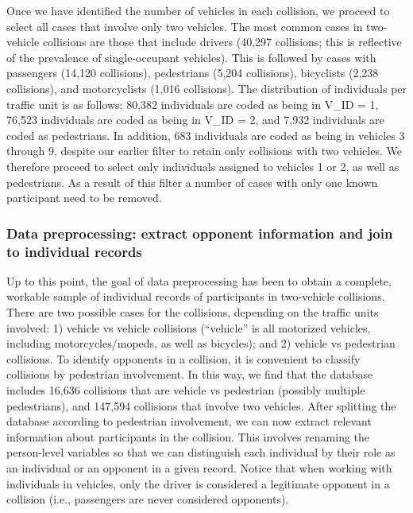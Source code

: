 \documentclass[]{elsarticle} %
\begin{document}
Once we have identified the number of vehicles in each collision, we
proceed to select all cases that involve only two vehicles. The most
common cases in two-vehicle collisions are those that include drivers
(40,297 collisions; this is reflective of the prevalence of
single-occupant vehicles). This is followed by cases with passengers
(14,120 collisions), pedestrians (5,204 collisions), bicyclists (2,238
collisions), and motorcyclists (1,016 collisions). The distribution of
individuals per traffic unit is as follows: 80,382 individuals are coded
as being in V\_ID = 1, 76,523 individuals are coded as being in V\_ID =
2, and 7,932 individuals are coded as pedestrians. In addition, 683
individuals are coded as being in vehicles 3 through 9, despite our
earlier filter to retain only collisions with two vehicles. We therefore
proceed to select only individuals assigned to vehicles 1 or 2, as well
as pedestrians. As a result of this filter a number of cases with only
one known participant need to be removed.

\hypertarget{data-preprocessing-extract-opponent-information-and-join-to-individual-records}{%
\subsubsection{Data preprocessing: extract opponent information and join
to individual
records}\label{data-preprocessing-extract-opponent-information-and-join-to-individual-records}}

Up to this point, the goal of data preprocessing has been to obtain a
complete, workable sample of individual records of participants in
two-vehicle collisions. There are two possible cases for the collisions,
depending on the traffic units involved: 1) vehicle vs vehicle
collisions (``vehicle'' is all motorized vehicles, including
motorcycles/mopeds, as well as bicycles); and 2) vehicle vs pedestrian
collisions. To identify opponents in a collision, it is convenient to
classify collisions by pedestrian involvement. In this way, we find that
the database includes 16,636 collisions that are vehicle vs pedestrian
(possibly multiple pedestrians), and 147,594 collisions that involve two
vehicles. After splitting the database according to pedestrian
involvement, we can now extract relevant information about participants
in the collision. This involves renaming the person-level variables so
that we can distinguish each individual by their role as an individual
or an opponent in a given record. Notice that when working with
individuals in vehicles, only the driver is considered a legitimate
opponent in a collision (i.e., passengers are never considered
opponents).
\end{document}
